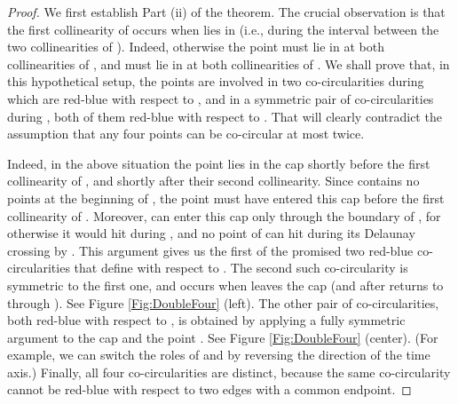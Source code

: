 \documentclass[letter,11pt]{article}
\begin{document}
\begin{proof}
We first establish Part (ii) of the theorem.
The crucial observation is that the first collinearity of  occurs when  lies in  (i.e., during the interval between the two collinearities of ). 
Indeed, otherwise the point  must lie in  at both collinearities of , and  must lie in  at both collinearities of . 
We shall prove that, in this hypothetical setup, the points  are involved in two co-circularities during  which are red-blue with respect to , and in a symmetric pair of co-circularities during , both of them red-blue with respect to . That will clearly contradict the assumption that any four points can be co-circular at most twice.

Indeed, in the above situation the point  lies in the cap  shortly before the first collinearity of , and shortly after their second collinearity. 
Since  contains no points at the beginning of , the point  must have entered this cap before the first collinearity of . Moreover,  can enter this cap only through the boundary of , for otherwise it would hit  during , and no point of  can hit  during its Delaunay crossing by . This argument gives us the first of the promised two red-blue co-circularities that  define with respect to . The second such co-circularity is symmetric to the first one, and occurs when  leaves the cap  (and after  returns to  through ). See Figure \ref{Fig:DoubleFour} (left).
The other pair of co-circularities, both red-blue with respect to , is obtained by applying a fully symmetric argument to the cap  and the point . See Figure \ref{Fig:DoubleFour} (center). (For example, we can switch the roles of  and  by reversing the direction of the time axis.)
Finally, all four co-circularities are distinct, because the same co-circularity cannot be red-blue with respect to two edges  with a common endpoint. 


\end{proof}
\end{document}

